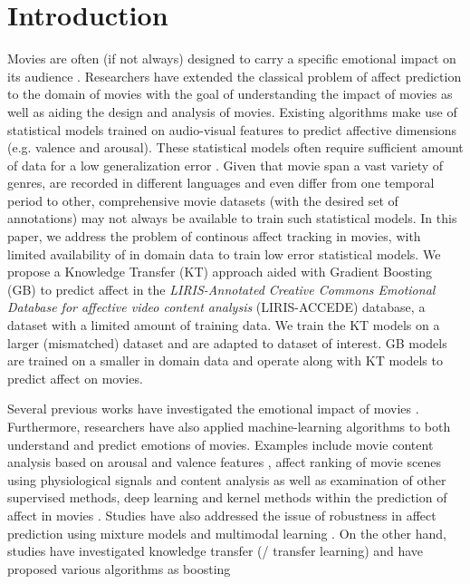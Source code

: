 \documentclass{article}
\begin{document}
\section{Introduction}
\label{sec:intro}
Movies are often (if not always) designed to carry a specific emotional impact on its audience \cite{}.
Researchers have extended the classical problem of affect prediction to the domain of movies with the goal of understanding the impact of movies as well as aiding the design and analysis of movies. 
Existing algorithms make use of statistical models trained on audio-visual features to predict affective dimensions (e.g. valence and arousal).  
These statistical models often require sufficient amount of data for a low generalization error \cite{}.
Given that movie span a vast variety of genres, are recorded in different languages and even differ from one temporal period to other, comprehensive movie datasets (with the desired set of annotations) may not always be available to train such statistical models. 
In this paper, we address the problem of continous affect tracking in movies, with limited availability of in domain data to train low error statistical models. 
We propose a Knowledge Transfer (KT) approach aided with Gradient Boosting (GB) to predict affect in the {\it LIRIS-Annotated Creative Commons Emotional Database for affective video content analysis} (LIRIS-ACCEDE) database, a dataset with a limited amount of training data.
We train the KT models on a larger (mismatched) dataset and are adapted to dataset of interest. 
GB models are trained on a smaller in domain data and operate along with KT models to predict affect on movies.

Several previous works have investigated the emotional impact of movies \cite{bartsch2010predicting, carroll2010movies}. 
Furthermore, researchers have also applied machine-learning algorithms to both understand and predict emotions of movies.
Examples include movie content analysis based on arousal and valence features \cite{xu2008hierarchical}, affect ranking of movie scenes using physiological signals and content analysis \cite{soleymani2008affective} as well as examination of other supervised methods, deep learning and kernel methods within the prediction of affect in movies \cite{malandrakis2011supervised, baveye2015deep}.
Studies have also addressed the issue of robustness in affect prediction using mixture models \cite{goyal2015multimodal} and multimodal learning \cite{pang2015mutlimodal}. 
On the other hand, studies have investigated knowledge transfer (/ transfer learning) and have proposed various algorithms as boosting \cite{} 
\end{document}
